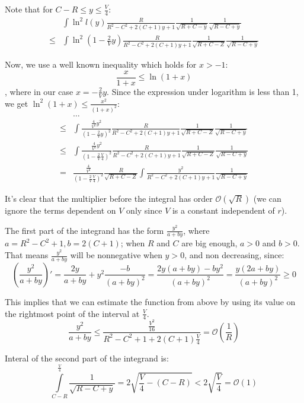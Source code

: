 \documentclass{gCOV2e}
\theoremstyle{plain}%
\theoremstyle{definition}
\theoremstyle{remark}
\newcommand{\mcO}{\mathcal{O}} %
\begin{document}
Note that for $C - R \le y \le \frac{V}{4}$:
\begin{align*}
       & \int \ln^2 l(y) \frac{R}{R^2 - C^2 + 2 (C + 1) y + 1} \frac{1}{\sqrt{R + C - y}} \frac{1}{\sqrt{R - C + y}}
\\ \le & \int \ln^2 (1 - \frac{2}{V} y) \frac{R}{R^2 - C^2 + 2 (C + 1) y + 1} \frac{1}{\sqrt{R + C - Z}} \frac{1}{\sqrt{R - C + y}}
\end{align*}

Now, we use a well known inequality which holds for $x > -1$: %
\[
\frac{x}{1 + x} \le \ln (1 + x)
\]
, where in our case $x = -\frac{2}{V} y$. Since the expression under logarithm is less than 1, we get $\ln^2 (1 + x) \le \frac{x^2}{(1 + x)^2}$:
\begin{align*}
       & \dots 
\\ \le & \int \frac{\frac{4}{V^2}y^2}{(1 - \frac{2}{V}y)^2}  \frac{R}{R^2 - C^2 + 2 (C + 1) y + 1} \frac{1}{\sqrt{R + C - Z}} \frac{1}{\sqrt{R - C + y}}
\\ \le & \int \frac{\frac{4}{V^2}y^2}{(1 - \frac{2}{V} \frac{V}{4})^2}  \frac{R}{R^2 - C^2 + 2 (C + 1) y + 1} \frac{1}{\sqrt{R + C - Z}} \frac{1}{\sqrt{R - C + y}}
\\ =   & \frac{\frac{4}{V^2}}{(1 - \frac{2}{V} \frac{V}{4})^2} \frac{R}{\sqrt{R + C - Z}}  \int \frac{y^2}{R^2 - C^2 + 2 (C + 1) y + 1}  \frac{1}{\sqrt{R - C + y}}
\end{align*}

It's clear that the multiplier before the integral has order $\mcO(\sqrt{R})$ (we can ignore the terms dependent on $V$ only since $V$ is a constant independent of $r$).

The first part of the integrand has the form $\frac{y^2}{a + b y}$, where $a = R^2 - C^2 + 1, b = 2 (C + 1)$; when $R$ and $C$ are big enough, $a > 0$ and $b > 0$. That means $\frac{y^2}{a + b y}$ will be nonnegative when $y > 0$, and non decreasing, since:
\[
  \left(\frac{y^2}{a + b y}\right)'
= \frac{2y}{a + by} + y^2 \frac{-b}{(a + by)^2}
= \frac{2y (a + by) - b y^2}{(a + by)^2}
= \frac{y (2a + by)}{(a + by)^2}
\ge 0
\]

This implies that we can estimate the function from above by using its value on the rightmost point of the interval at $\frac{V}{4}$.
\[
\frac{y^2}{a + b y} \le \frac{\frac{V^2}{16}}{R^2 - C^2 + 1 + 2 (C + 1) \frac{V}{4}} = \mcO\left(\frac{1}{R}\right)
\]

Interal of the second part of the integrand is:
\[
\int\limits_{C - R}^{\frac{V}{4}} \frac{1}{\sqrt{R - C + y}} = 2 \sqrt{\frac{V}{4} - (C - R)} < 2 \sqrt{\frac{V}{4}} = \mcO(1)
\]
\end{document}
